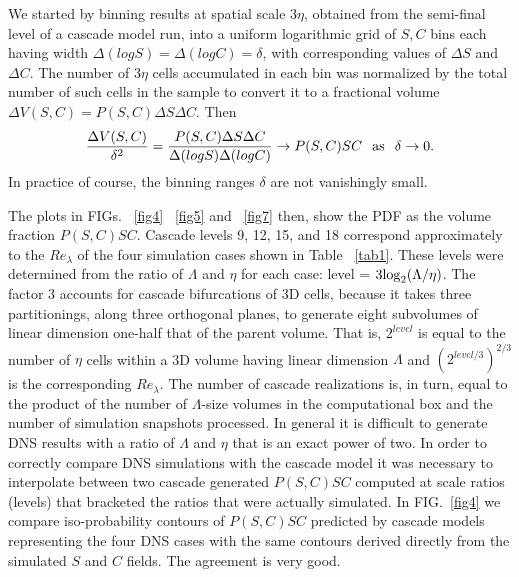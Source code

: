 \documentclass[aps,pra,twocolumn,groupedaddress,showkeys,showpacs,floatfix]{revtex4}
\begin{document}
We started by binning results at spatial scale $3\eta$, obtained from
the semi-final level of a cascade model run, into a uniform logarithmic grid of
$S,C$ bins each having width $\Delta(logS) = \Delta(logC) = \delta$, with 
corresponding values of $\Delta S$ and $\Delta C$. 
The number of $3\eta$ cells accumulated in each bin was normalized
by the total number of such cells in the sample to convert it to a
fractional volume $\Delta V(S,C) = P(S,C)\Delta S \Delta C$. Then
\begin{equation}
\frac{\Delta V(S,C)}{\delta^2} =
\frac{ P(S,C)\Delta S \Delta C}{\Delta (logS) \Delta (logC)}
\rightarrow P(S,C)SC \hspace{0.1 in} {\rm as} \hspace{0.1 in} \delta \rightarrow 0.
\end{equation}
In practice of course, the binning ranges $\delta$ are not vanishingly small.
 
The plots in FIGs. ~\ref{fig4} ~\ref{fig5} and ~\ref{fig7} then, show the PDF as the 
volume fraction $P(S,C)SC$. Cascade
levels 9, 12, 15, and 18    correspond approximately to the $Re_\lambda$ of the
four simulation cases shown in Table ~\ref{tab1}. These levels were determined from the
ratio of $\Lambda$ and $\eta$ for each case: level = $3 {\rm log}_2(\Lambda/
\eta)$. The factor $3$ accounts for cascade bifurcations of 3D cells, because
it takes three partitionings, along three orthogonal planes, to generate eight
subvolumes of linear dimension one-half that of the parent volume. That is,
$2^{level}$ is equal to the number of $\eta$ cells within a 3D volume having
linear dimension $\Lambda$ and $(2^{level/3})^{2/3}$ is the corresponding $Re_{\lambda}$.
The number of cascade realizations is, in turn,
equal to the product of the number of $\Lambda$-size volumes in the
computational box and the number of simulation snapshots processed. In general
it is difficult to generate DNS results with a    ratio of $\Lambda$ and $\eta$
that is an exact power of two.    In order to correctly compare DNS simulations
with the cascade model it was    necessary to interpolate between two cascade
generated $P(S,C)SC$ computed    at scale ratios (levels) that bracketed the
ratios that were    actually simulated. In FIG.~\ref{fig4} we compare iso-probability  contours
of $P(S,C)SC$    predicted by cascade models representing the four DNS cases
with the same contours derived directly from the simulated $S$
and $C$ fields. The agreement is very good.
\end{document}
